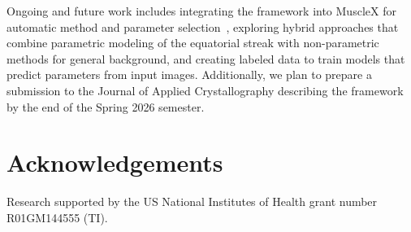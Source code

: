 \documentclass[iucr]{iucrjournals}
\begin{document}


Ongoing and future work includes integrating the framework into MuscleX for automatic method and parameter selection~\cite{JiratrakanvongEtAl2024,lee2019musclex,madhurapantula2026musclexdi}, exploring hybrid approaches that combine parametric modeling of the equatorial streak with non-parametric methods for general background, and creating labeled data to train models that predict parameters from input images. Additionally, we plan to prepare a submission to the Journal of Applied Crystallography describing the framework by the end of the Spring 2026 semester.









\section*{Acknowledgements}
Research supported by the US National Institutes of Health grant number R01GM144555 (TI).






% 
% 
\end{document}
